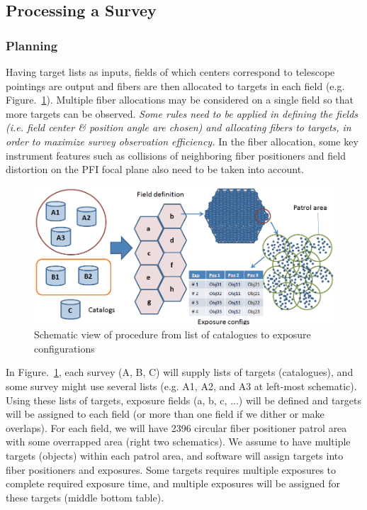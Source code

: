 \documentclass[a4paper,notitlepage]{article}
\begin{document}
\subsection{Processing a Survey}

\subsubsection{Planning}

Having target lists as inputs, fields of which centers correspond to
telescope pointings are output and fibers are then allocated to targets
in each field
(e.g. Figure.~\ref{fig:sciops-scireq-slide-svyexp}). Multiple fiber
allocations may be considered on a single field so that more targets can
be observed. {\it Some rules need to be applied in defining the fields
(i.e. field center \& position angle are chosen) and allocating fibers
to targets, in order to maximize survey observation efficiency.}  In the
fiber allocation, some key instrument features such as collisions of
neighboring fiber positioners and field distortion on the PFI focal
plane also need to be taken into account.

\begin{figure}[htb]
  \begin{center}
    \includegraphics[width=.75\linewidth]{sciops-scireq-slide-svyexp.png}
  \end{center}
  \caption{Schematic view of procedure from list of catalogues to exposure 
    configurations}
  \label{fig:sciops-scireq-slide-svyexp}
\end{figure}

In Figure.~\ref{fig:sciops-scireq-slide-svyexp}, 
each survey (A, B, C) will supply lists of targets (catalogues), 
and some survey might use several lists (e.g. A1, A2, and A3 at left-most 
schematic). 
Using these lists of targets, exposure fields (a, b, c, ...) will be defined 
and targets will be assigned to each field (or more than one field if we 
dither or make overlaps). 
For each field, we will have 2396 circular fiber positioner patrol area 
with some overrapped area (right two schematics). 
We assume to have multiple targets (objects) within each patrol area, 
and software will assign targets into fiber positioners and exposures. 
Some targets requires multiple exposures to complete required exposure time, 
and multiple exposures will be assigned for these targets
(middle bottom table). 
\end{document}
